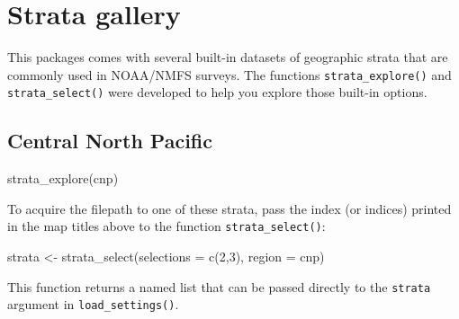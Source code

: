 \documentclass[
]{book}
\newenvironment{Shaded}{\begin{snugshade}}{\end{snugshade}}
\newcommand{\AttributeTok}[1]{\textcolor[rgb]{0.77,0.63,0.00}{#1}}
\newcommand{\DecValTok}[1]{\textcolor[rgb]{0.00,0.00,0.81}{#1}}
\newcommand{\FunctionTok}[1]{\textcolor[rgb]{0.00,0.00,0.00}{#1}}
\newcommand{\NormalTok}[1]{#1}
\newcommand{\OtherTok}[1]{\textcolor[rgb]{0.56,0.35,0.01}{#1}}
\newcommand{\StringTok}[1]{\textcolor[rgb]{0.31,0.60,0.02}{#1}}
\begin{document}
\hypertarget{stratagallery}{%
\chapter{Strata gallery}\label{stratagallery}}

This packages comes with several built-in datasets of geographic strata that are commonly used in NOAA/NMFS surveys. The functions \texttt{strata\_explore()} and \texttt{strata\_select()} were developed to help you explore those built-in options.

\hypertarget{central-north-pacific}{%
\section*{Central North Pacific}\label{central-north-pacific}}

\begin{Shaded}
\begin{Highlighting}[]
\FunctionTok{strata\_explore}\NormalTok{(}\StringTok{\textquotesingle{}cnp\textquotesingle{}}\NormalTok{)}
\end{Highlighting}
\end{Shaded}

To acquire the filepath to one of these strata, pass the index (or indices) printed in the map titles above to the function \texttt{strata\_select()}:

\begin{Shaded}
\begin{Highlighting}[]
\NormalTok{strata }\OtherTok{\textless{}{-}} \FunctionTok{strata\_select}\NormalTok{(}\AttributeTok{selections =} \FunctionTok{c}\NormalTok{(}\DecValTok{2}\NormalTok{,}\DecValTok{3}\NormalTok{),}
                              \AttributeTok{region =} \StringTok{\textquotesingle{}cnp\textquotesingle{}}\NormalTok{)}
\end{Highlighting}
\end{Shaded}

This function returns a named list that can be passed directly to the \texttt{strata} argument in \texttt{load\_settings()}.
\end{document}
